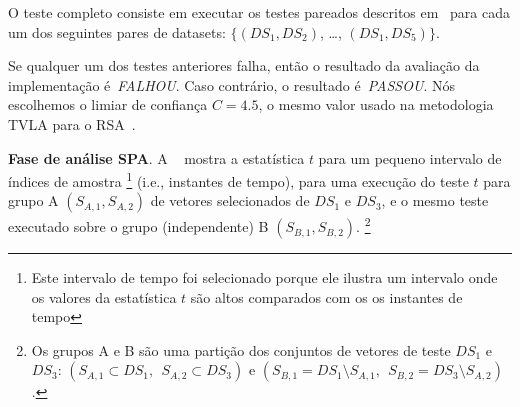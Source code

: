 O teste completo consiste em executar os testes pareados descritos em~\cite{Witteman2011} para cada um dos seguintes pares de datasets: $\{(DS_1,DS_2)$, \dots, $(DS_1,DS_5) \}$.
%

%
Se qualquer um dos testes anteriores falha, então o resultado da avaliação da implementação é~\textit{FALHOU}. Caso contrário, o resultado é~\textit{PASSOU}. Nós escolhemos o limiar de confiança $C = 4.5$, o mesmo valor usado na metodologia TVLA para o RSA~\cite{Witteman2011}.
%
%

\noindent \textbf{Fase de análise SPA}. A ~ mostra a estatística $t$ para um pequeno intervalo de índices de amostra
%
%
\footnote{Este intervalo de tempo foi selecionado porque ele ilustra um intervalo onde os valores da estatística $t$ são altos comparados com os os instantes de tempo} (i.e., instantes de tempo),
%
%
para uma execução do teste $t$ para grupo A $(S_{A,1},S_{A,2})$ de vetores selecionados de $DS_1$ e $DS_3$, e o mesmo teste executado sobre o grupo (independente) B $(S_{B,1},S_{B,2})$.
%
%
\footnote{Os grupos A e B são uma partição dos conjuntos de vetores de teste $DS_1$ e $DS_3$: $(S_{A,1}\subset DS_1,\ \  S_{A,2}\subset DS_3)$ e $(S_{B,1} = DS_1\setminus S_{A,1},\ \ S_{B,2} = DS_3\setminus S_{A,2})$.} 
%
%

